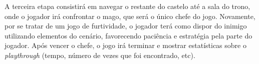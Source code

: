 	A terceira etapa consistirá em navegar o restante do castelo até a sala do trono, onde o jogador irá confrontar o mago, que será o único chefe do jogo. Novamente, por se tratar de um jogo de furtividade, o jogador terá como dispor do inimigo utilizando elementos do cenário, favorecendo paciência e estratégia pela parte do jogador. Após vencer o chefe, o jogo irá terminar e mostrar estatísticas sobre o \emph{playthrough} (tempo, número de vezes que foi encontrado, etc).

